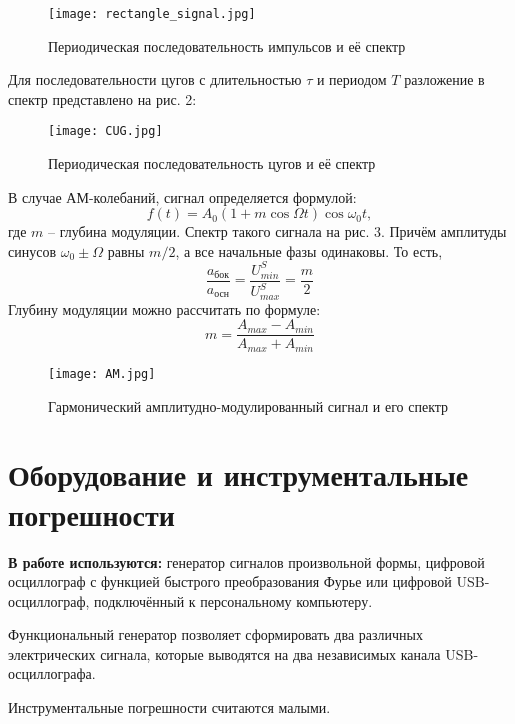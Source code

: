 \begin{figure}[h]
    \centering
    \texttt{[image: rectangle\_signal.jpg]}
    \caption{Периодическая последовательность импульсов и её спектр}
    \label{fig:table1}
\end{figure}

Для последовательности цугов с длительностью $ \tau  $ и периодом $ T $ разложение в спектр представлено на рис. 2:

\begin{figure}[h]
    \centering
    \texttt{[image: CUG.jpg]}
    \caption{Периодическая последовательность цугов и её спектр}
    \label{fig:table1}
\end{figure}

В случае АМ-колебаний, сигнал определяется формулой:
\begin{equation*}\label{key}
	f(t) = A_0 \left(1+m \cos \Omega t \right) \cos \omega_0 t,
\end{equation*}
где $ m $ -- глубина модуляции.
Спектр такого сигнала на рис. 3. Причём амплитуды синусов $ \omega_0 \pm \Omega $ равны $ m/2 $, а все начальные фазы одинаковы. То есть,
\begin{equation*}\label{new}
	\frac{a_\text{бок}}{a_\text{осн}} = \frac{U_{min}^S}{U_{max}^S} = \frac{m}{2}
\end{equation*} Глубину модуляции можно рассчитать по формуле:
\begin{equation*}\label{m}
	m = \frac{A_{max}-A_{min}}{A_{max}+A_{min}}
\end{equation*}
\begin{figure}[h]
    \centering
    \texttt{[image: AM.jpg]}
    \caption{Гармонический амплитудно-модулированный сигнал и его спектр}
    \label{fig:table1}
\end{figure}


\section{Оборудование и инструментальные погрешности}

\textbf{В работе используются:} генератор сигналов произвольной формы, цифровой осциллограф с функцией быстрого преобразования Фурье или цифровой USB-осциллограф, подключённый к персональному компьютеру.

Функциональный генератор позволяет сформировать два различных электрических сигнала, которые выводятся на два независимых канала USB-осциллографа.

Инструментальные погрешности считаются малыми.
